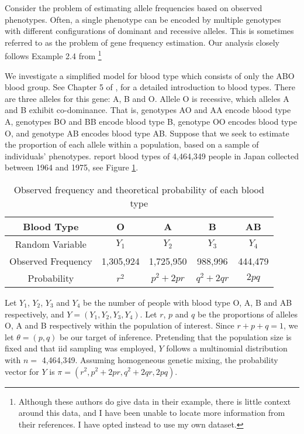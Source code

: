 \documentclass[11pt, oneside]{article}   	%
\begin{document}
Consider the problem of estimating allele frequencies based on observed phenotypes. Often, a single phenotype can be encoded by multiple genotypes with different configurations of dominant and recessive alleles. This is sometimes referred to as the problem of gene frequency estimation. Our analysis closely follows Example 2.4 from \citet{McL08}\footnote{Although these authors do give data in their example, there is little context around this data, and I have been unable to locate more information from their references. I have opted instead to use my own dataset.}

We investigate a simplified model for blood type which consists of only the ABO blood group. See Chapter 5 of \citet{Dea05}, for a detailed introduction to blood types. There are three alleles for this gene: A, B and O. Allele O is recessive, which alleles A and B exhibit co-dominance. That is, genotypes AO and AA encode blood type A, genotypes BO and BB encode blood type B, genotype OO encodes blood type O, and genotype AB encodes blood type AB. Suppose that we seek to estimate the proportion of each allele within a population, based on a sample of individuals' phenotypes. \citet{Fuj78} report blood types of 4,464,349 people in Japan collected between 1964 and 1975, see Figure \ref{tab:blood_type}. 

\begin{table}
    \centering
    \caption{Observed frequency and theoretical probability of each blood type \citep{Fuj78}}
    \begin{tabular}{c|cccc}
        Blood Type & O & A & B & AB\\
        \hline
        Random Variable & $Y_1$ & $Y_2$ & $Y_3$ & $Y_4$\\
        Observed Frequency & 1,305,924 & 1,725,950 & 988,996 & 444,479\\
        Probability & $r^2$ & $p^2 + 2pr$ & $q^2 + 2qr$ & $2pq$
    \end{tabular}
    \label{tab:blood_type}
\end{table}

Let $Y_1$, $Y_2$, $Y_3$ and $Y_4$ be the number of people with blood type O, A, B and AB respectively, and $Y = (Y_1, Y_2, Y_3, Y_4)$. Let $r$, $p$ and $q$ be the proportions of alleles O, A and B respectively within the population of interest. Since $r + p + q = 1$, we let $\theta = (p, q)$ be our target of inference. Pretending that the population size is fixed and that iid sampling was employed, $Y$ follows a multinomial distribution with $n =$ 4,464,349. Assuming homogeneous genetic mixing, the probability vector for $Y$ is $\pi = (r^2, p^2 + 2pr, q^2 + 2qr, 2pq)$.
\end{document}
